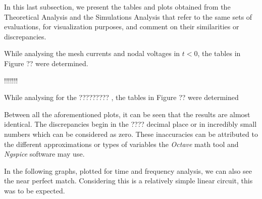 In this last subsection, we present the tables and plots obtained from the Theoretical Analysis and the Simulations Analysis that refer to the same sets of evaluations, for visualization purposes, and comment on their similarities or discrepancies.

While analysing the mesh currents and nodal voltages in $t<0$, the tables in Figure ?? were determined.

!!!!!!!

While analysing for the ????????? , the tables in Figure ?? were determined


Between all the aforementioned plots, it can be seen that the results are almost identical. The discrepancies begin in the ???? decimal place or in incredibly small numbers which can be considered as zero. These inaccuracies can be attributed to the different approximations or types of variables the \textit{Octave} math tool and \textit{Ngspice} software may use.

In the following graphs, plotted for time and frequency analysis, we can also see the near perfect match. Considering this is a relatively simple linear circuit, this was to be expected.
